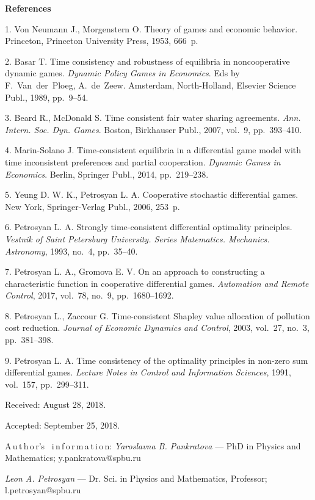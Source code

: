 
{\small

\vskip6mm

\noindent \textbf{References} }

\vskip 2mm

{\footnotesize

1.  Von Neumann J.,  Morgenstern O. Theory of games and economic
behavior. Princeton, Princeton University Press, 1953, 666~p.

2.  Basar T. Time consistency and robustness of equilibria in
noncooperative dynamic games.  {\it Dynamic Policy Games in
Economics}. Eds by F.~Van~der~Ploeg, A.~de~Zeew. Amsterdam,
North-Holland, Elsevier Science Publ., 1989, pp.~9--54.

3. Beard R., McDonald S. Time consistent fair water sharing
agreements. {\it  Ann. Intern. Soc. Dyn. Games}. Boston,
Birkhauser Publ., 2007, vol.~9, pp.~393--410.

4. Marin-Solano J. Time-consistent equilibria in a differential
game model with time inconsistent preferences and partial
cooperation. {\it Dynamic Games in Economics}. Berlin, Springer
Publ., 2014, \mbox{pp.~219--238}.

5.   Yeung  D. W. K.,   Petrosyan L. A.  Cooperative stochastic
differential games. New York, Springer-Verlag Publ., 2006, 253~p.

6. Petrosyan L. A. Strongly time-consistent differential
optimality principles. {\it Vestnik of Saint Petersburg
University. Series Matematics. Mechanics. Astronomy}, 1993, no.~4,
pp.~35--40.

7.  Petrosyan L. A., Gromova E. V. On an approach to constructing
a characteristic function in cooperative differential games. {\it
Automation and Remote Control}, 2017, vol.~78, no.~9,
pp.~1680--1692.

8. Petrosyan L.,  Zaccour G. Time-consistent Shapley value
allocation of pollution cost reduction. {\it   Journal of Economic
Dynamics and Control}, 2003,  vol.~27, no.~3, pp.~381--398.

9.  Petrosyan L. A.  Time consistency of the optimality principles
in non-zero sum differential games. {\it  Lecture Notes in Control
and Information Sciences}, 1991, vol.~157, pp.~299--311.

\vskip 1.5mm

%


Received:  August 28, 2018.

Accepted: September 25, 2018.


\vskip6mm A\,u\,t\,h\,o\,r's \ i\,n\,f\,o\,r\,m\,a\,t\,i\,o\,n:
\vskip2mm\textit{Yaroslavna B. Pankratova} ---  PhD in Physics and
Mathematics; y.pankratova@spbu.ru

\vskip2mm\textit{Leon A. Petrosyan} --- Dr. Sci. in Physics and
Mathematics, Professor; l.petrosyan@spbu.ru

}
